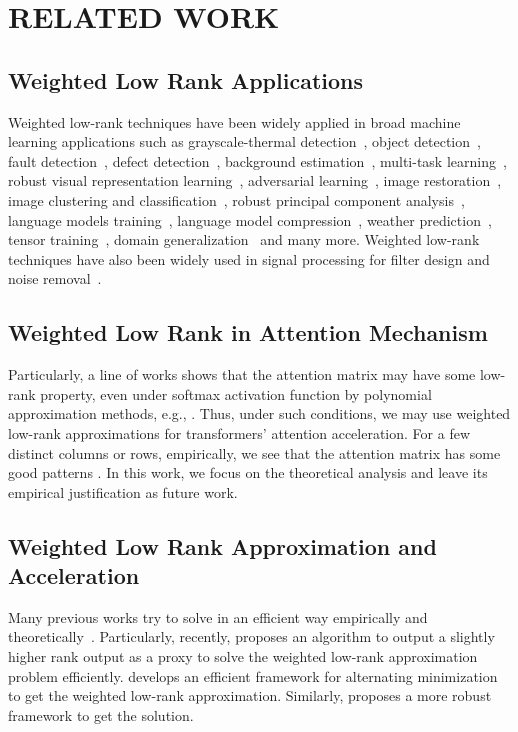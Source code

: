 \section{RELATED WORK}\label{sec:related}

\subsection{Weighted Low Rank Applications}
Weighted low-rank techniques have been widely applied in broad machine learning applications such as grayscale-thermal detection~\cite{lwz+16}, object detection~\cite{twzl16,cxt22}, fault detection~\cite{dcz+17}, defect detection~\cite{mww+20,jld+20}, background estimation~\cite{dl17,dlr18}, multi-task learning~\cite{flct18}, robust visual representation learning~\cite{kjn15,wzx+18,wwz+19}, adversarial learning~\cite{lbb+19}, image restoration~\cite{psdx14,cyz+20}, image clustering and classification~\cite{sjs+11,wl17,wllz18,fzcw21,fzc+22,fzc+22b,kkk+23,pcp+23}, robust principal component analysis~\cite{xxf+21}, language models training~\cite{hhw+22}, language model compression~\cite{hhc+21}, weather prediction~\cite{wtl18}, tensor training~\cite{cwc+21,zwht+22}, domain generalization~\cite{smf+24} and many more.
Weighted low-rank techniques have also been widely used in signal processing for filter design and noise removal~\cite{lpw97,lhzc10,jycl15}. 

\subsection{Weighted Low Rank in Attention Mechanism} Particularly, a line of works shows that the attention matrix may have some low-rank property, even under softmax activation function by polynomial approximation methods, e.g., \cite{as23,kll+25_var,lls+25_prune,chl+24_rope,llss24_sparse,lls+24c,lss+24,lssy24,lssz24_tat,swxl24,xsl24,as24_iclr,as24_rope,as24b,hsk+24,hwg+24,hwl+24,hwsl24}. Thus, under such conditions, we may use weighted low-rank approximations for transformers' attention acceleration. For a few distinct columns or rows, empirically, we see that the attention matrix has some good patterns \cite{jlz+24,cls+25,lls+25_grok,cll+25_icl,smn+24}. In this work, we focus on the theoretical analysis and leave its empirical justification as future work.

\subsection{Weighted Low Rank Approximation and Acceleration}
Many previous works try to solve in an efficient way empirically and theoretically~\cite{mmh03,slv04,wj06,mv07,m08,ev12,mxzz13,mu14,rsw16,llr16,d16,dl17,dl17b,bwz19,hlx+19,zqz+19,swz+20,th21,yzls22,syyz23,zyls24}. Particularly, recently, \cite{wy24} proposes an algorithm to output a slightly higher rank output as a proxy to solve the weighted low-rank approximation problem efficiently.
\cite{llr16} develops an efficient framework for alternating minimization to get the weighted low-rank approximation. Similarly, \cite{syyz23} proposes a more robust framework to get the solution. 



